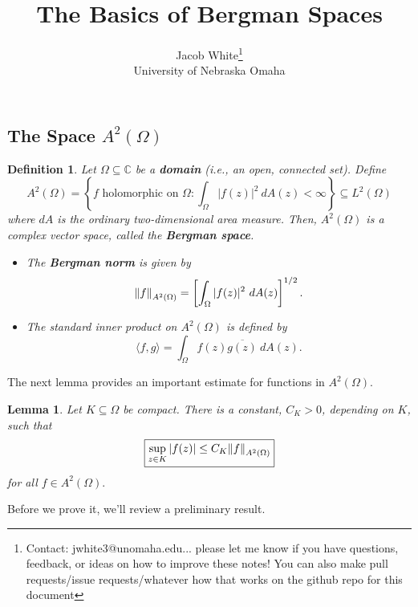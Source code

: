 \documentclass[10pt]{article}
\title{\textbf{The Basics of Bergman Spaces}}
\date{}
\author{Jacob White\footnote{Contact: jwhite3@unomaha.edu... please let me know if you have questions, feedback, or ideas on how to improve these notes! You can also make pull requests/issue requests/whatever how that works on the github repo for this document} \\ University of Nebraska Omaha}
\theoremstyle{plain}
\newtheorem{definition}{Definition}
\newtheorem{lemma}{Lemma}
\begin{document}
	\maketitle 
	

\subsection*{The Space $A^2(\Omega)$}

	\begin{definition}
		Let $\Omega \subseteq \mathbb{C}$ be a \textbf{\textit{domain}} (i.e., an open, connected set). Define $$A^2(\Omega) = \left\{f \text{ holomorphic on } \Omega: \int_\Omega |f(z)|^2 \ dA(z) < \infty\right\} \subseteq L^2(\Omega)$$ where $dA$ is the ordinary two-dimensional area measure. Then, $A^2(\Omega)$ is a complex vector space, called the \textbf{\textit{Bergman space}}. 
			\begin{itemize}
				\item The \textbf{\textit{Bergman norm}} is given by $$\norm{f}_{A^2(\Omega)} = \left[\int_\Omega |f(z)|^2  \ dA(z)\right]^{1/2}.$$
				
				\item The standard inner product on $A^2(\Omega)$ is defined by $$\langle f, g \rangle = \int_\Omega f(z) \overline{g(z)} \ dA(z).$$
			\end{itemize} 
	\end{definition}
	
	The next lemma provides an important estimate for functions in $A^2(\Omega)$. 
	
	\begin{lemma}
		
		Let $K \subseteq \Omega$ be compact. There is a constant, $C_K > 0$, depending on $K$, such that $$\boxed{\sup_{z \in K} |f(z)| \leq C_K \norm{f}_{A^2(\Omega)}}$$ for all $f \in A^2(\Omega).$ 
		
	\end{lemma} 
	
	\noindent Before we prove it, we'll review a preliminary result. 
	
\end{document}
